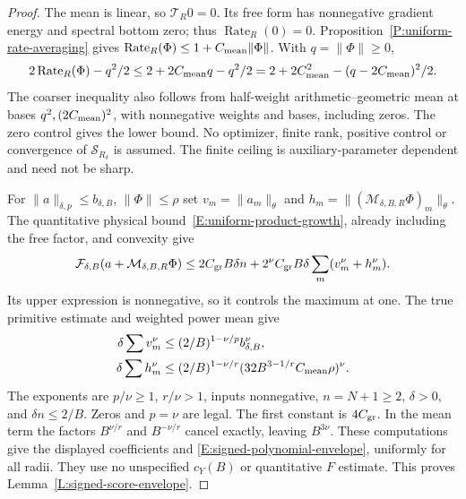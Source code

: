 \begin{proof}
  The mean is linear, so $\mathcal T_R0=0$.
  Its free form has nonnegative gradient energy and spectral bottom zero;
  thus $\operatorname{Rate}_R(0)=0$.
  Proposition~\ref{P:uniform-rate-averaging} gives
  $\operatorname{Rate}_R(\Phi)\le1+C_{\rm mean}\|\Phi\|$.
  With $q=\|\Phi\|\ge0$,
  \[
    2\operatorname{Rate}_R(\Phi)-q^2/2
    \le2+2C_{\rm mean}q-q^2/2
    =2+2C_{\rm mean}^2-(q-2C_{\rm mean})^2/2 .
  \]
  The coarser inequality also follows from half-weight
  arithmetic--geometric mean at bases $q^2,(2C_{\rm mean})^2$,
  with nonnegative weights and bases, including zeros.
  The zero control gives the lower bound.
  No optimizer, finite rank, positive control or convergence of
  $\mathcal S_{R_\delta}$ is assumed.
  The finite ceiling is auxiliary-parameter dependent and need not be sharp.

  For $\|a\|_{\delta,p}\le b_{\delta,B}$, $\|\Phi\|\le\rho$ set
  $v_m=\|a_m\|_\theta$ and
  $h_m=\|(\mathcal M_{\delta,B,R}\Phi)_m\|_\theta$.
  The quantitative physical bound~\eqref{E:uniform-product-growth},
  already including the free factor, and convexity give
  \[
    \mathcal F_{\delta,B}(a+\mathcal M_{\delta,B,R}\Phi)
    \le2C_{\rm gr}B\delta n
    +2^\nu C_{\rm gr}B\delta\sum_m(v_m^\nu+h_m^\nu).
  \]
  Its upper expression is nonnegative, so it controls the maximum at one.
  The true primitive estimate and weighted power mean give
  \begin{align*}
    \delta\sum v_m^\nu&\le(2/B)^{1-\nu/p}b_{\delta,B}^\nu,\\
    \delta\sum h_m^\nu&\le(2/B)^{1-\nu/r}
    (32B^{3-1/r}C_{\rm mean}\rho)^\nu .
  \end{align*}
  The exponents are $p/\nu\ge1$, $r/\nu>1$, inputs nonnegative,
  $n=N+1\ge2$, $\delta>0$, and $\delta n\le2/B$.
  Zeros and $p=\nu$ are legal.
  The first constant is $4C_{\rm gr}$.
  In the mean term the factors $B^{\nu/r}$ and $B^{-\nu/r}$
  cancel exactly, leaving $B^{3\nu}$.
  These computations give the displayed coefficients and
  \eqref{E:signed-polynomial-envelope}, uniformly for all radii.
  They use no unspecified $c_Y(B)$ or quantitative $F$ estimate.
  This proves Lemma~\ref{L:signed-score-envelope}.
\end{proof}

